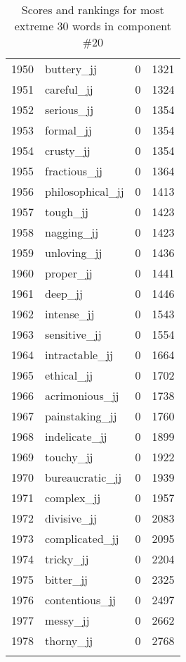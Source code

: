 \begin{longtable}[!htbp]{| rlr@{.}l |}
    1950 & buttery\_jj & 0 & 1321 \\
    1951 & careful\_jj & 0 & 1324 \\
    1952 & serious\_jj & 0 & 1354 \\
    1953 & formal\_jj & 0 & 1354 \\
    1954 & crusty\_jj & 0 & 1354 \\
    1955 & fractious\_jj & 0 & 1364 \\
    1956 & philosophical\_jj & 0 & 1413 \\
    1957 & tough\_jj & 0 & 1423 \\
    1958 & nagging\_jj & 0 & 1423 \\
    1959 & unloving\_jj & 0 & 1436 \\
    1960 & proper\_jj & 0 & 1441 \\
    1961 & deep\_jj & 0 & 1446 \\
    1962 & intense\_jj & 0 & 1543 \\
    1963 & sensitive\_jj & 0 & 1554 \\
    1964 & intractable\_jj & 0 & 1664 \\
    1965 & ethical\_jj & 0 & 1702 \\
    1966 & acrimonious\_jj & 0 & 1738 \\
    1967 & painstaking\_jj & 0 & 1760 \\
    1968 & indelicate\_jj & 0 & 1899 \\
    1969 & touchy\_jj & 0 & 1922 \\
    1970 & bureaucratic\_jj & 0 & 1939 \\
    1971 & complex\_jj & 0 & 1957 \\
    1972 & divisive\_jj & 0 & 2083 \\
    1973 & complicated\_jj & 0 & 2095 \\
    1974 & tricky\_jj & 0 & 2204 \\
    1975 & bitter\_jj & 0 & 2325 \\
    1976 & contentious\_jj & 0 & 2497 \\
    1977 & messy\_jj & 0 & 2662 \\
    1978 & thorny\_jj & 0 & 2768 \\
    \hline
    \caption{Scores and rankings for most extreme 30 words in component \#20} \\
\end{longtable}
